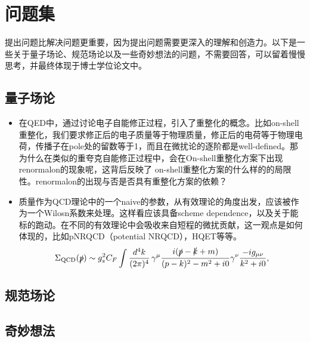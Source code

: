 \chapter{问题集}
\label{chap:question}
提出问题比解决问题更重要，因为提出问题需要更深入的理解和创造力。以下是一些关于量子场论、规范场论以及一些奇妙想法的问题，不需要回答，可以留着慢慢思考，并最终体现于博士学位论文中。
\section{量子场论}
\begin{itemize}
    \item 在QED中，通过讨论电子自能修正过程，引入了重整化的概念。比如on-shell重整化，我们要求修正后的电子质量等于物理质量，修正后的电荷等于物理电荷，传播子在pole处的留数等于1，而且在微扰论的逐阶都是well-defined。那为什么在类似的重夸克自能修正过程中，会在On-shell重整化方案下出现renormalon的现象呢，这背后反映了 on-shell重整化方案的什么样的的局限性。renormalon的出现与否是否具有重整化方案的依赖？
    \item 质量作为QCD理论中的一个naive的参数，从有效理论的角度出发，应该被作为一个Wilosn系数来处理。这样看应该具备scheme dependence，以及关于能标的跑动。在不同的有效理论中会吸收来自短程的微扰贡献，这一观点是如何体现的，比如pNRQCD（potential NRQCD），HQET等等。
\[
\Sigma_{\rm QCD}(\slashed p)\sim g_s^2 C_F
\int \frac{d^4k}{(2\pi)^4}\,
\gamma^\mu \frac{i(\slashed p-\slashed k+m)}{(p-k)^2-m^2+i0}\gamma^\nu
\frac{-ig_{\mu\nu}}{k^2+i0},
\]
\end{itemize}
\section{规范场论}
\section{奇妙想法}